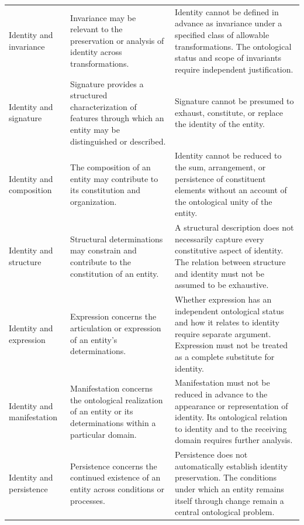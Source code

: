\begin{table}[htbp]
\begin{tabular}{p{3.3cm} p{5.0cm} p{5.3cm}}
        Identity and invariance &
        Invariance may be relevant to the preservation or analysis of identity across transformations. &
        Identity cannot be defined in advance as invariance under a specified class of allowable transformations. The ontological status and scope of invariants require independent justification. \\

        Identity and signature &
        Signature provides a structured characterization of features through which an entity may be distinguished or described. &
        Signature cannot be presumed to exhaust, constitute, or replace the identity of the entity. \\

        Identity and composition &
        The composition of an entity may contribute to its constitution and organization. &
        Identity cannot be reduced to the sum, arrangement, or persistence of constituent elements without an account of the ontological unity of the entity. \\

        Identity and structure &
        Structural determinations may constrain and contribute to the constitution of an entity. &
        A structural description does not necessarily capture every constitutive aspect of identity. The relation between structure and identity must not be assumed to be exhaustive. \\

        Identity and expression &
        Expression concerns the articulation or expression of an entity's determinations. &
        Whether expression has an independent ontological status and how it relates to identity require separate argument. Expression must not be treated as a complete substitute for identity. \\

        Identity and manifestation &
        Manifestation concerns the ontological realization of an entity or its determinations within a particular domain. &
        Manifestation must not be reduced in advance to the appearance or representation of identity. Its ontological relation to identity and to the receiving domain requires further analysis. \\

        Identity and persistence &
        Persistence concerns the continued existence of an entity across conditions or processes. &
        Persistence does not automatically establish identity preservation. The conditions under which an entity remains itself through change remain a central ontological problem. \\


\end{tabular}
\end{table}
